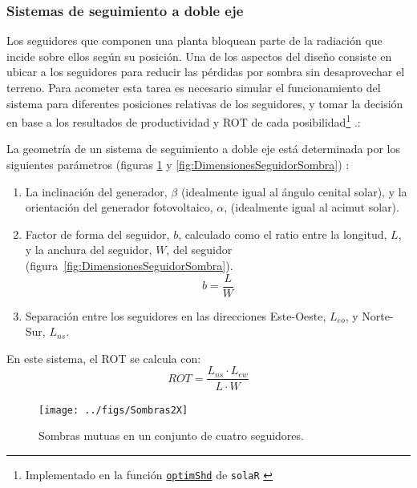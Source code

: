 \subsubsection{Sistemas de seguimiento a doble eje}

Los seguidores que componen una planta bloquean parte de la radiación
que incide sobre ellos según su posición. Una de los aspectos del
diseño consiste en ubicar a los seguidores para reducir las pérdidas
por sombra sin desaprovechar el terreno. Para acometer esta tarea
es necesario simular el funcionamiento del sistema para diferentes
posiciones relativas de los seguidores, y tomar la decisión en base
a los resultados de productividad y ROT de cada
posibilidad\footnote{Implementado en la función \href{http://search.r-project.org/R/library/solaR/html/optimShd.html}{\texttt{optimShd}} de
  \texttt{solaR} \cite{Perpinan2012b}} \cite{Perpinan2008}.:

La geometría de un sistema de seguimiento a doble eje está determinada
por los siguientes parámetros (figuras \ref{fig:Sombras2X} y \ref{fig:DimensionesSeguidorSombra})
: 
\begin{enumerate}
\item La inclinación del generador, $\beta$ (idealmente igual al ángulo
cenital solar), y la orientación del generador fotovoltaico, $\alpha$,
(idealmente igual al acimut solar).
\item Factor de forma del seguidor, $b$,
calculado como el ratio entre la longitud, $L$, y la anchura del
seguidor, $W$,
del seguidor (figura~\ref{fig:DimensionesSeguidorSombra}).
\begin{equation}
b=\frac{L}{W}
\end{equation}

\item Separación entre los seguidores en las direcciones Este-Oeste, 
$L_{eo}$,
y Norte-Sur, $L_{ns}$. 
\end{enumerate}
%
En este sistema, el ROT se calcula con:
\begin{equation}
  \label{eq:ROT2x}
  ROT=\frac{L_{ns} \cdot L_{ew}}{L \cdot W}
\end{equation}

\begin{figure}
\begin{centering}
\texttt{[image: ../figs/Sombras2X]}
\end{centering}

\caption{\label{fig:Sombras2X}Sombras mutuas en un conjunto de cuatro seguidores.}

\end{figure}

